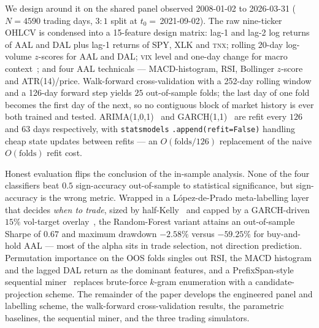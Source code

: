 \documentclass[runningheads]{llncs}
\begin{document}
We design around it on the shared panel observed 2008-01-02 to
2026-03-31 ($N{=}\num{4590}$ trading days, $3{:}1$ split at
$t_0{=}\,$2021-09-02). The raw nine-ticker OHLCV is condensed into a
15-feature design matrix: lag-1 and lag-2 log returns of AAL and
DAL plus lag-1 returns of SPY, XLK and \textsc{tnx}; rolling 20-day
log-volume $z$-scores for AAL and DAL; \textsc{vix} level and
one-day change for macro context~\cite{whaley2000}; and four AAL
technicals --- MACD-histogram, RSI, Bollinger $z$-score and
ATR(14)/price. Walk-forward cross-validation with a 252-day rolling
window and a 126-day forward step yields $25$ out-of-sample folds; the
last day of one fold becomes the first day of the next, so no
contiguous block of market history is ever both trained and tested.
ARIMA(1,0,1)~\cite{box1970} and GARCH(1,1)~\cite{engle1982,bollerslev1986}
are refit every $126$ and $63$ days respectively, with
\texttt{statsmodels} \verb|.append(refit=False)| handling cheap state
updates between refits --- an $O(\text{folds}/126)$ replacement of the
naive $O(\text{folds})$ refit cost.

Honest evaluation flips the conclusion of the in-sample analysis. None
of the four classifiers beat $0.5$ sign-accuracy out-of-sample to
statistical significance, but sign-accuracy is the wrong metric.
Wrapped in a López-de-Prado meta-labelling
layer~\cite{lopez2018} that decides \emph{when to trade}, sized by
half-Kelly~\cite{kelly1956} and capped by a GARCH-driven $15\%$
vol-target overlay~\cite{rockafellar2000}, the Random-Forest variant
attains an out-of-sample Sharpe of $\num{0.67}$ and maximum drawdown
$-2.58\%$ versus $-59.25\%$ for buy-and-hold AAL --- most of the
alpha sits in trade selection, not direction prediction. Permutation
importance on the OOS folds singles out RSI, the MACD histogram and
the lagged DAL return as the dominant features, and a
PrefixSpan-style sequential miner~\cite{pei2001prefixspan} replaces
brute-force $k$-gram enumeration with a candidate-projection scheme.
The remainder of the paper develops the engineered panel and labelling
scheme, the walk-forward cross-validation results, the parametric
baselines, the sequential miner, and the three trading simulators.

\end{document}
